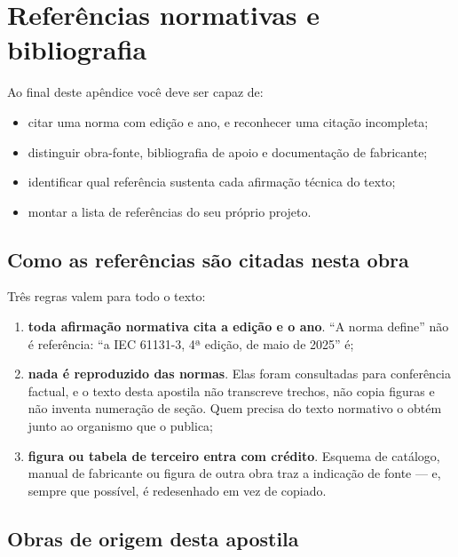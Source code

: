 \chapter{Referências normativas e bibliografia}
\label{apD}

\begin{objetivos}
Ao final deste apêndice você deve ser capaz de:
\begin{itemize}
  \item citar uma norma com edição e ano, e reconhecer uma citação incompleta;
  \item distinguir obra-fonte, bibliografia de apoio e documentação de fabricante;
  \item identificar qual referência sustenta cada afirmação técnica do texto;
  \item montar a lista de referências do seu próprio projeto.
\end{itemize}
\end{objetivos}

\section{Como as referências são citadas nesta obra}

Três regras valem para todo o texto:

\begin{enumerate}
  \item \textbf{toda afirmação normativa cita a edição e o ano}. ``A norma define'' não é referência:
        ``a IEC 61131-3, 4ª edição, de maio de 2025'' é;
  \item \textbf{nada é reproduzido das normas}. Elas foram consultadas para conferência factual, e o
        texto desta apostila não transcreve trechos, não copia figuras e não inventa numeração de
        seção. Quem precisa do texto normativo o obtém junto ao organismo que o publica;
  \item \textbf{figura ou tabela de terceiro entra com crédito}. Esquema de catálogo, manual de
        fabricante ou figura de outra obra traz a indicação de fonte --- e, sempre que possível, é
        redesenhado em vez de copiado.
\end{enumerate}


\section{Obras de origem desta apostila}

